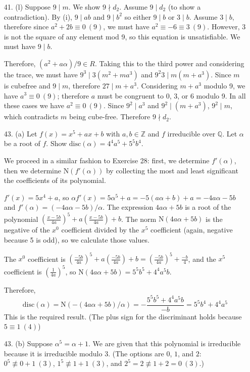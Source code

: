 \documentclass{article}
\newcommand{\Q}[0]{\mathbb{Q}}
\newcommand{\Z}[0]{\mathbb{Z}}
\newcommand{\norm}[0]{\text{N}}
\newcommand{\disc}[1]{\text{disc}(#1)}
\newcommand{\modequiv}[3]{#1 \equiv #2\ (#3)}
\begin{document}
\begin{enumerate}
\item[41. (l)]  Suppose $9 \mid m$.  We show $9 \nmid d_2$.  Assume $9 \mid d_2$ (to show a contradiction).  By (i), $9 \mid ab$ and $9 \mid b^2$ so either $9 \mid b$ or $3 \mid b$.  Assume $3 \mid b$, therefore since $\modequiv{a^2 + 2b}{0}{9}$, we must have $\modequiv{a^2}{-6 \equiv 3}{9}$.  However, 3 is not the square of any element mod 9, so this equation is unsatisfiable.  We must have $9 \mid b$.

Therefore, $(a^2 + a\alpha) / 9 \in R$.  Taking this to the third power and considering the trace, we must have $9^3 \mid 3(m^2 + ma^3)$ and $9^2 3 \mid m(m + a^3)$.  Since $m$ is cubefree and $9 \mid m$, therefore $27 \mid m + a^3$.  Considering $m + a^3$ modulo 9, we have $\modequiv{a^3}{0}{9}$; therefore $a$ must be congruent to 0, 3, or 6 modulo 9.  In all these cases we have $\modequiv{a^2}{0}{9}$.  Since $9^2 \mid a^3$ and $9^2 \mid (m + a^3)$, $9^2 \mid m$, which contradicts $m$ being cube-free.  Therefore $9 \nmid d_2$.

\item[43. (a)] Let $f(x) = x^5 + ax + b$ with $a, b \in \Z$ and $f$ irreducible over $\Q$.  Let $\alpha$ be a root of $f$.  Show $\disc{\alpha} = 4^4 a^5 + 5^5 b^4$.

We proceed in a similar fashion to Exercise 28: first, we determine $f'(\alpha)$, then we determine $\norm(f'(\alpha))$ by collecting the most and least significant the coefficients of its polynomial.

$f'(x) = 5x^4 + a$, so $\alpha f'(x) = 5\alpha^5 + a = -5(a\alpha + b) + a = -4a \alpha - 5b$ and $f'(\alpha) = (-4a\alpha - 5b) / \alpha$.  The expression $4a\alpha + 5b$ is a root of the polynomial $(\frac{x - 5b}{4a})^5 + a(\frac{x - 5b}{4a}) + b$.  The norm $\norm(4a\alpha + 5b)$ is the negative of the $x^0$ coefficient divided by the $x^5$ coefficient (again, negative because 5 is odd), so we calculate those values.

The $x^0$ coefficient is $(\frac{-5b}{4a})^5 + a(\frac{-5b}{4a}) + b = (\frac{-5b}{4a})^5 + \frac{-b}{4}$, and the $x^5$ coefficient is $(\frac{1}{4a})^5$, so $\norm(4a\alpha + 5b) = 5^5 b^5 + 4^4 a^5 b$.

Therefore, \[ \disc{\alpha} = \norm(-(4a\alpha + 5b)/\alpha) = -\frac{5^5 b^5 + 4^4 a^5 b}{-b} = 5^5 b^4 + 4^4 a^5 \]  This is the required result.  (The plus sign for the discriminant holds because $5 \equiv 1\ (4)$)

\item [43. (b)] Suppose $\alpha^5 = \alpha + 1$.  We are given that this polynomial is irreducible because it is irreducible modulo 3.  (The options are $0$, $1$, and $2$: $0^5 \not\equiv 0 + 1\ (3)$, $1^5 \not\equiv 1 + 1\ (3)$, and $2^5 = 2 \not\equiv 1 + 2 = 0\ (3)$.)


\end{enumerate}
\end{document}
